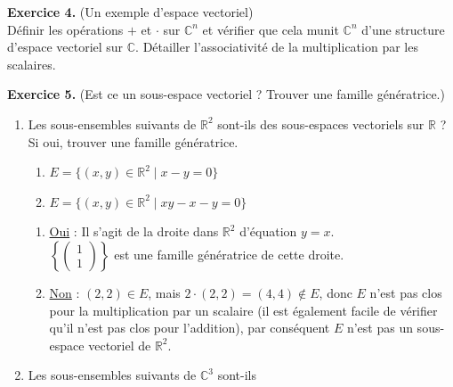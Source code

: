 \documentclass[a4paper, 10pt]{report}
\begin{document}
	\newpage
	
	\fancyhf{}
	\renewcommand{\headrule}
	{\rule{\textwidth}{0pt}}
	
	\noindent
	\textbf{Exercice 4.} (Un exemple d'espace vectoriel)\\
	Définir les opérations $+$ et $\cdot$ sur $\mathbb{C}^n$ et
	vérifier que cela munit $\mathbb{C}^n$ d'une structure d'espace
	vectoriel sur $\mathbb{C}$. Détailler l'associativité de la
	multiplication par les scalaires.
	
	\vspace{5mm}
	\noindent
	\textbf{Exercice 5.} (Est ce un sous-espace vectoriel ?
	Trouver une famille génératrice.)
	
	\begin{enumerate}[label=\arabic*.]
		\item Les sous-ensembles suivants de $\mathbb{R}^2$ sont-ils
		des sous-espaces vectoriels sur $\mathbb{R}$ ? Si oui, trouver
		une famille génératrice.
		\begin{enumerate}[label=(\alph*)]
			\item $E = \{(x, y) \in \mathbb{R}^2 \mid x - y = 0\}$
			\item $E = \{(x, y) \in \mathbb{R}^2 \mid xy - x - y = 0\}$
		\end{enumerate}
		\colorbox{solution}
		{
			\begin{minipage}{0.9\textwidth}
				\begin{enumerate}[label=(\alph*)]
					\item \underline{Oui} : Il s'agit de la droite dans
					$\mathbb{R}^2$ d'équation $y = x$.\\
					$\left\{\left(\begin{smallmatrix}
						1\\
						1
					\end{smallmatrix}\right)\right\}$
					est une famille génératrice de cette droite.
					\item \underline{Non} : $(2, 2) \in E$, mais
					$2 \cdot (2, 2) = (4, 4) \notin E$, donc $E$ n'est pas
					clos pour la multiplication par un scalaire (il est
					également facile de vérifier qu'il n'est pas clos
					pour l'addition), par conséquent $E$ n'est pas un
					sous-espace vectoriel de $\mathbb{R}^2$.
				\end{enumerate}
			\end{minipage}
		}
		\item Les sous-ensembles suivants de $\mathbb{C}^3$ sont-ils

\end{enumerate}
\end{document}
